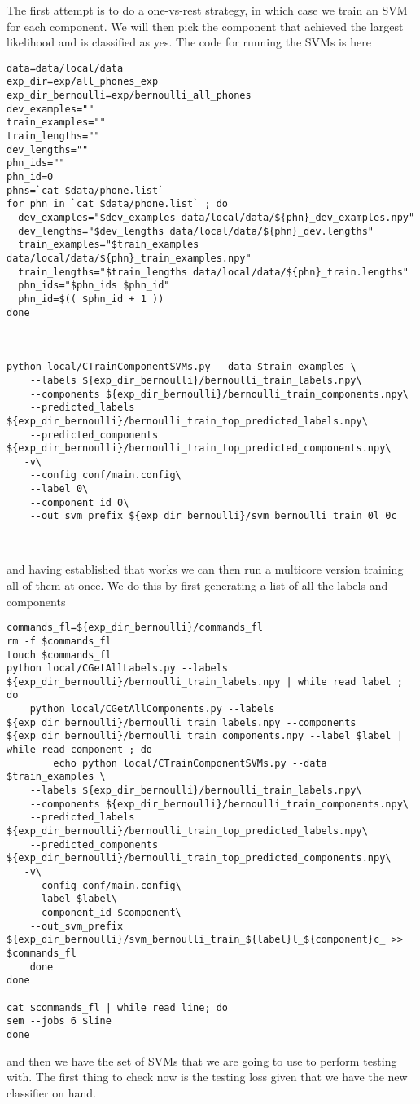 \documentclass{article}
\begin{document}
The first attempt is to do a one-vs-rest strategy, in which case
we train an SVM for each component.  We will then pick the component that
achieved the largest likelihood and is classified as yes.
The code for running the SVMs is here
\begin{verbatim}
data=data/local/data
exp_dir=exp/all_phones_exp
exp_dir_bernoulli=exp/bernoulli_all_phones
dev_examples=""
train_examples=""
train_lengths=""
dev_lengths=""
phn_ids=""
phn_id=0
phns=`cat $data/phone.list`
for phn in `cat $data/phone.list` ; do
  dev_examples="$dev_examples data/local/data/${phn}_dev_examples.npy"
  dev_lengths="$dev_lengths data/local/data/${phn}_dev.lengths"
  train_examples="$train_examples data/local/data/${phn}_train_examples.npy"
  train_lengths="$train_lengths data/local/data/${phn}_train.lengths"
  phn_ids="$phn_ids $phn_id"
  phn_id=$(( $phn_id + 1 ))
done



python local/CTrainComponentSVMs.py --data $train_examples \
    --labels ${exp_dir_bernoulli}/bernoulli_train_labels.npy\
    --components ${exp_dir_bernoulli}/bernoulli_train_components.npy\
    --predicted_labels ${exp_dir_bernoulli}/bernoulli_train_top_predicted_labels.npy\
    --predicted_components ${exp_dir_bernoulli}/bernoulli_train_top_predicted_components.npy\
   -v\
    --config conf/main.config\
    --label 0\
    --component_id 0\
    --out_svm_prefix ${exp_dir_bernoulli}/svm_bernoulli_train_0l_0c_



\end{verbatim}
and having established that works we can then run a multicore version
training all of them at once. We do this by first generating a list
of all the labels and components
\begin{verbatim}
commands_fl=${exp_dir_bernoulli}/commands_fl
rm -f $commands_fl
touch $commands_fl
python local/CGetAllLabels.py --labels ${exp_dir_bernoulli}/bernoulli_train_labels.npy | while read label ; do
    python local/CGetAllComponents.py --labels ${exp_dir_bernoulli}/bernoulli_train_labels.npy --components ${exp_dir_bernoulli}/bernoulli_train_components.npy --label $label | while read component ; do
        echo python local/CTrainComponentSVMs.py --data $train_examples \
    --labels ${exp_dir_bernoulli}/bernoulli_train_labels.npy\
    --components ${exp_dir_bernoulli}/bernoulli_train_components.npy\
    --predicted_labels ${exp_dir_bernoulli}/bernoulli_train_top_predicted_labels.npy\
    --predicted_components ${exp_dir_bernoulli}/bernoulli_train_top_predicted_components.npy\
   -v\
    --config conf/main.config\
    --label $label\
    --component_id $component\
    --out_svm_prefix ${exp_dir_bernoulli}/svm_bernoulli_train_${label}l_${component}c_ >> $commands_fl
    done
done

cat $commands_fl | while read line; do
sem --jobs 6 $line
done
\end{verbatim}
and then we have the set of SVMs that we are going to use
to perform testing with.  The first thing to check now is the testing
loss given that we have the new classifier on hand.
\end{document}
